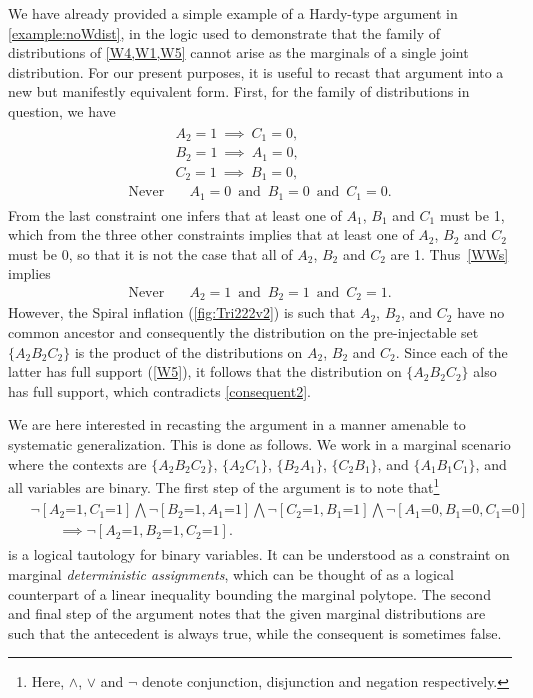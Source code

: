 \documentclass[aps,english,superscriptaddress,onecolumn,twoside,longbibliography,pra,floatfix,fleqn,nofootinbib]{revtex4-1}%
\theoremstyle{definition}
\newcounter{example}[section]
\newcommand{\cramp}[1]{\ensuremath{\mathord{#1}}}
\newcommand{\eql}{\cramp{=}}
\begin{document}
We have already provided a simple example of a Hardy-type argument in \cref{example:noWdist}, in the logic used to demonstrate that the family of distributions of \cref{W4,W1,W5} cannot arise as the marginals of a single joint distribution. For our present purposes, it is useful to recast that argument into a new but manifestly equivalent form. First, for the family of distributions in question, we have
\begin{align} 
\begin{split}\label{WWs}
&A_2 = 1 \:\implies\: C_1 = 0,\\
&B_2 = 1 \:\implies\: A_1 = 0,\\
&C_2  = 1 \:\implies\: B_1  = 0,\\
\text{Never}  &\quad A_1  = 0\,\text{ and }\, B_1  = 0\,\text{ and }\, C_1  = 0.
\end{split}
\end{align}
From the last constraint one infers that at least one of $A_1$, $B_1$ and $C_1$ must be 1, which from the three other constraints implies that at least one of $A_2$, $B_2$ and $C_2$ must be 0, so that it is not the case that all of $A_2$, $B_2$ and $C_2$ are 1.  Thus~\cref{WWs} implies
\begin{align} \label{consequent2}
\text{Never}  \quad &A_2  = 1\,\text{ and }\, B_2  = 1\,\text{ and }\, C_2  = 1.
\end{align}
However, the Spiral inflation (\cref{fig:Tri222v2}) is such that $A_2$, $B_2$, and $C_2$ have no common ancestor and consequently the distribution on the pre-injectable set $\{A_2 B_2 C_2\}$ is the product of the distributions on $A_2$, $B_2$ and $C_2$.  Since each of the latter has full support (\cref{W5}), it follows that the distribution on $\{A_2 B_2 C_2\}$ also has full support, which contradicts \cref{consequent2}.

We are here interested in recasting the argument in a manner amenable to systematic generalization. This is done as follows. We work in a marginal scenario where the contexts are $\{A_2 B_2 C_2\}$, $\{A_2 C_1\}$, $\{B_2 A_1\}$, $\{C_2 B_1\}$, and  $\{A_1 B_1 C_1\}$, and all variables are binary. The first step of the argument is to note that\footnote{Here, $\land$, $\lor$ and $\lnot$ denote conjunction, disjunction and negation respectively.}
\begin{align}\begin{split}\label{tautology1}
&\lnot [A_2 \eql 1, C_1 \eql 1] \bigwedge \lnot [B_2 \eql 1, A_1 \eql 1] \bigwedge \lnot [C_2 \eql 1, B_1 \eql 1] \bigwedge \lnot [A_1 \eql 0, B_1 \eql 0, C_1 \eql 0]\\
 &\qquad\implies
\lnot [A_2 \eql 1, B_2 \eql 1, C_2 \eql 1].
\end{split}\end{align}
is a logical tautology for binary variables. It can be understood as a constraint on marginal {\em deterministic assignments}, which can be thought of as a logical counterpart of a linear inequality bounding the marginal polytope. The second and final step of the argument notes that the given marginal distributions are such that the antecedent is always true, while the consequent is sometimes false.
\end{document}
